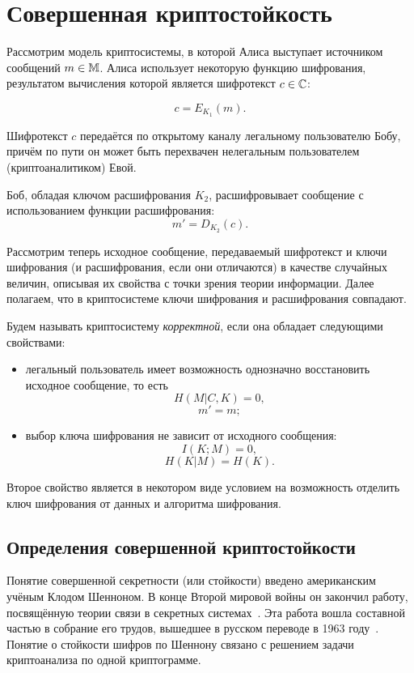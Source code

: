 \chapter{Совершенная криптостойкость}

Рассмотрим модель криптосистемы, в которой Алиса выступает источником сообщений $m \in \mathbb{M}$. Алиса использует некоторую функцию шифрования, результатом вычисления которой является шифротекст $c \in \mathbb{C}$:

	\[c = E_{K_1}\left(m\right).\]

Шифротекст $c$ передаётся по открытому каналу легальному пользователю Бобу, причём по пути он может быть перехвачен нелегальным пользователем (криптоаналитиком) Евой.

Боб, обладая ключом расшифрования $K_2$, расшифровывает сообщение с использованием функции расшифрования:
	\[m' = D_{K_2}\left(c \right).\]

Рассмотрим теперь исходное сообщение, передаваемый шифротекст и ключи шифрования (и расшифрования, если они отличаются) в качестве случайных величин, описывая их свойства с точки зрения теории информации. Далее полагаем, что в криптосистеме ключи шифрования и расшифрования совпадают.

Будем называть криптосистему \emph{корректной}, если она обладает следующими свойствами:
\begin{itemize}
	\item легальный пользователь имеет возможность однозначно восстановить исходное сообщение, то есть
					\[H \left( M | C, K \right) = 0, \]
					\[m' = m;\]
	\item выбор ключа шифрования не зависит от исходного сообщения:
					\[ I \left( K ; M \right) = 0, \]
					\[ H \left( K | M \right) = H \left( K \right). \]
\end{itemize}

Второе свойство является в некотором виде условием на возможность отделить ключ шифрования от данных и алгоритма шифрования.

\section[Определения]{Определения совершенной криптостойкости}

Понятие совершенной секретности (или стойкости) введено американским учёным Клодом Шенноном. В конце Второй мировой войны он закончил работу, посвящённую теории связи в секретных системах~\cite{Shannon:1949:CTS}. Эта работа вошла составной частью в собрание его трудов, вышедшее в русском переводе в 1963 году~\cite{Shannon:1963}. Понятие о стойкости шифров по Шеннону связано с решением задачи криптоанализа по одной криптограмме.

